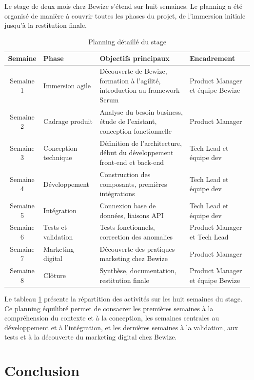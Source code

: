 Le stage de deux mois chez Bewize s'étend sur huit semaines. Le planning 
a été organisé de manière à couvrir toutes les phases du projet, de 
l'immersion initiale jusqu'à la restitution finale.

\begin{table}[H]
\centering
\caption{Planning détaillé du stage}
\label{tab:planning}
\renewcommand{\arraystretch}{1.8}
\begin{tabular}{|c|p{3.5cm}|p{5cm}|p{3cm}|}
\hline
\textbf{Semaine} & \textbf{Phase} & \textbf{Objectifs principaux} & 
\textbf{Encadrement} \\
\hline
Semaine 1 & Immersion agile & Découverte de Bewize, formation à 
l'agilité, introduction au framework Scrum & 
Product Manager et équipe Bewize \\
\hline
Semaine 2 & Cadrage produit & Analyse du besoin business, étude de 
l'existant, conception fonctionnelle & Product Manager \\
\hline
Semaine 3 & Conception technique & Définition de l'architecture, 
début du développement front-end et back-end & Tech Lead et équipe dev \\
\hline
Semaine 4 & Développement & Construction des composants, premières 
intégrations & Tech Lead et équipe dev \\
\hline
Semaine 5 & Intégration & Connexion base de données, liaisons API & 
Tech Lead et équipe dev \\
\hline
Semaine 6 & Tests et validation & Tests fonctionnels, correction des 
anomalies & Product Manager et Tech Lead \\
\hline
Semaine 7 & Marketing digital & Découverte des pratiques marketing 
chez Bewize & Product Manager \\
\hline
Semaine 8 & Clôture & Synthèse, documentation, restitution finale & 
Product Manager et équipe Bewize \\
\hline
\end{tabular}
\end{table}

Le tableau \ref{tab:planning} présente la répartition des activités 
sur les huit semaines du stage. Ce planning équilibré permet de 
consacrer les premières semaines à la compréhension du contexte et 
à la conception, les semaines centrales au développement et à 
l'intégration, et les dernières semaines à la validation, aux tests 
et à la découverte du marketing digital chez Bewize.

\section{Conclusion}

